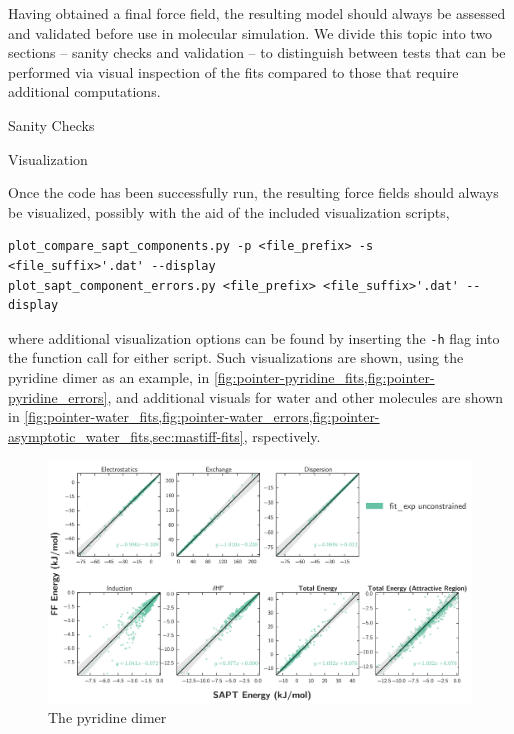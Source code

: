 Having obtained a final force field, the resulting model should always be
assessed and validated before use in molecular simulation. We divide this
topic into two sections -- sanity checks and validation -- to distinguish
between tests that can be performed via visual inspection of the fits compared
to those that require additional computations.

\begin{subsection}{Sanity Checks}

\begin{paragraph}{Visualization}

Once the \pointer code has been successfully run, the resulting force fields
should always be visualized, possibly with the aid of the included
visualization scripts,
%
\begin{lstlisting}
plot_compare_sapt_components.py -p <file_prefix> -s <file_suffix>'.dat' --display
plot_sapt_component_errors.py <file_prefix> <file_suffix>'.dat' --display
\end{lstlisting}
%
where additional visualization options can be found by inserting the \verb|-h|
flag into the function call for either script. Such visualizations are shown,
using the pyridine dimer as an example, in
\cref{fig:pointer-pyridine_fits,fig:pointer-pyridine_errors}, and additional
visuals for water and other molecules are shown in
\cref{fig:pointer-water_fits,fig:pointer-water_errors,fig:pointer-asymptotic_water_fits,sec:mastiff-fits},
rspectively.

\begin{figure}
\centering
\includegraphics[width=\textwidth]{pointer/pyridine/sapt_comparison.pdf}
\caption[Comparison with the pyridine dimer]
{The pyridine dimer}
\label{fig:pointer-pyridine_fits}
\end{figure}


\end{paragraph}
\end{subsection}
